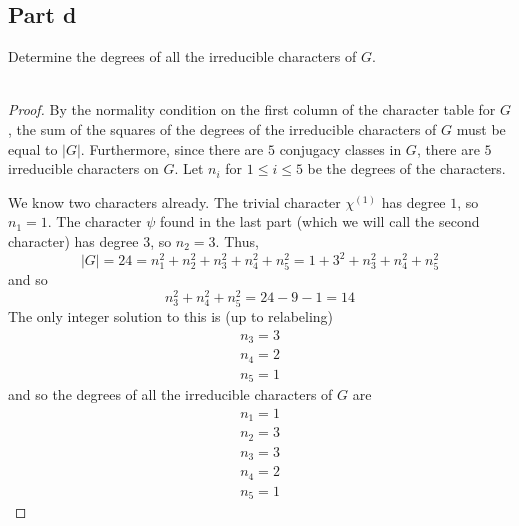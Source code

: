 \documentclass[12pt,reqno]{amsart}
\begin{document}
\subsection*{Part d}
Determine the degrees of all the irreducible characters of $G$.
\\
\\
\begin{proof}
    By the normality condition on the first column of the character table for
    $G$, the sum of the squares of the degrees of the irreducible characters of
    $G$ must be equal to $|G|$. Furthermore, since there are $5$ conjugacy
    classes in $G$, there are $5$ irreducible characters on $G$. Let $n_i$ for
    $1\leq i\leq 5$ be the degrees of the characters.

    We know two characters already. The trivial character $\chi^{(1)}$ has
    degree $1$, so $n_1=1$. The character $\psi$ found in the last part (which
    we will call the second character) has degree $3$, so $n_2 = 3$. Thus,
    \[
        |G| = 24 = n_1^2 + n_2^2 + n_3^2 + n_4^2 + n_5^2 = 1 + 3^2 + n_3^2 + n_4^2 + n_5^2
    \]
    and so
    \[
        n_3^2 + n_4^2 + n_5^2 = 24-9-1 = 14
    \]
    The only integer solution to this is (up to relabeling)
    \[
        \begin{aligned}
            n_3 = 3\\
            n_4 = 2\\
            n_5 = 1
        \end{aligned}
    \]
    and so the degrees of all the irreducible characters of $G$ are
    \[
        \begin{aligned}
            n_1 = 1\\
            n_2 = 3\\
            n_3 = 3\\
            n_4 = 2\\
            n_5 = 1
        \end{aligned}
    \]
\end{proof}
\end{document}
